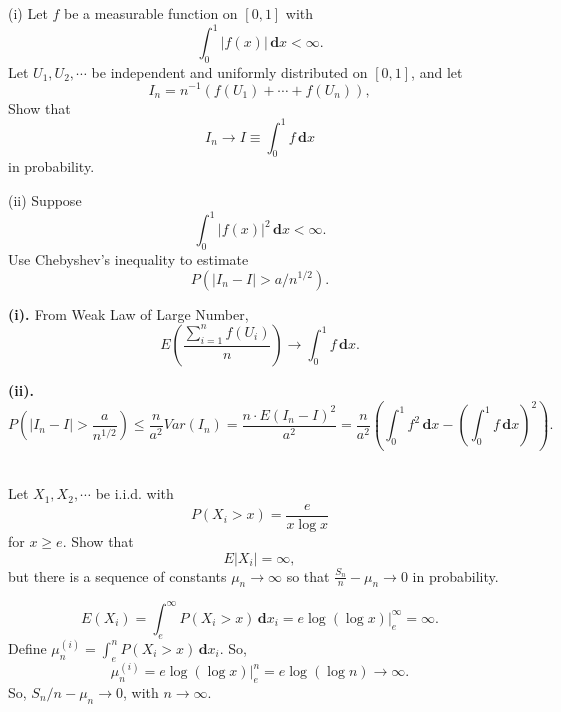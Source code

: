 \documentclass[en, normal, 11pt, black]{elegantnote}
\newenvironment{exercise}[1]{\begin{tcolorbox}[colback=black!15, colframe=black!80, breakable, title=#1]}{\end{tcolorbox}}
\renewenvironment{proof}{\begin{tcolorbox}[colback=white, colframe=black!50, breakable, title=Proof. ]\setlength{\parskip}{0.8em}}{\,\\\rightline{$\square$}\end{tcolorbox}}
\newcommand{\der}{\,\mathbf{d}}
\begin{document}
    \begin{exercise}{2.2.3. Monte Carlo integration. }
        (i) Let $f$ be a measurable function on $[0,1]$ with 
        \[
            \int_{0}^{1}|f(x)| \der x<\infty. 
        \]
        Let $U_{1}, U_{2}, \cdots$ be independent and uniformly distributed on $[0,1]$, and let
        \[
            I_{n}=n^{-1}\left(f\left(U_{1}\right)+\cdots+f\left(U_{n}\right)\right), 
        \]
        Show that 
        \[
            I_{n} \rightarrow I \equiv \int_{0}^{1} f \der x
        \]
        in probability. 
        
        (ii) Suppose 
        \[
            \int_{0}^{1}|f(x)|^{2} \der x<\infty. 
        \]
        Use Chebyshev's inequality to estimate 
        \[
            P\left(\left|I_{n}-I\right|>a / n^{1 / 2}\right). 
        \]
    \end{exercise}

    \begin{proof}
        {\bfseries{(i). }}
        From Weak Law of Large Number, 
        \[
            E\left(\frac{\sum_{i=1}^nf(U_i)}{n}\right)\to \int_0^1f\der x. 
        \]

        {\bfseries{(ii). }}
        \[
            P\left(|I_n-I|>\frac{a}{n^{1/2}}\right)\leqslant\frac{n}{a^2}Var(I_n)=\frac{n\cdot E(I_n-I)^2}{a^2}=\frac{n}{a^2}\left(\int_0^1f^2\der x-\left(\int_0^1f\der x\right)^2\right). 
        \]
        \vspace*{-20pt}
    \end{proof}

    \begin{exercise}{2.2.5}
        Let $X_{1}, X_{2}, \cdots$ be i.i.d. with 
        \[
            P\left(X_{i}>x\right)=\frac{e}{x \log x}
        \]
        for $x \geqslant e$. Show that 
        \[
            E\left|X_{i}\right|=\infty, 
        \]
        but there is a sequence of constants $\mu_{n} \rightarrow \infty$ so that $\frac{S_{n}}{n}-\mu_{n} \rightarrow 0$ in probability. 
    \end{exercise}

    \begin{proof}
        \[
            E(X_i)=\int_e^\infty P(X_i>x)\der x_i=e\log(\log x)\big|_e^\infty=\infty. 
        \]
        Define $\mu_n^{(i)}=\int_e^nP(X_i>x)\der x_i$. So, 
        \[
            \mu_n^{(i)}=e\log(\log x)\big|_e^n=e\log(\log n)\to\infty. 
        \]
        So, $S_n/n-\mu_n\to0$, with $n\to\infty$. 
    \end{proof}
\end{document}
